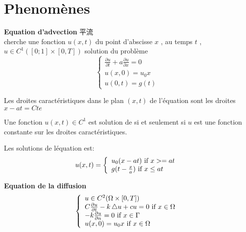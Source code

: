 \section{Phenom\`enes}
\textbf{Equation d'advection}
平流\\
cherche une fonction $u(x,t)$ du point d'abscisse $ x$ , au temps $ t$ , $ u \in C^1([0;1] \times [0,T])$ solution du probl\`eme
\begin{equation}
\left\{
  \begin{array}{ll}
		  \frac{\partial  u}{\partial t} + a \frac{\partial u}{\partial x } = 0 \\
		  u(x,0) = u_0{x} \\
		  u(0,t) = g(t)
  \end{array}
\right.
\end{equation}
\begin{definition}
		Les droites caract\'eristiques dans le plan $(x,t)$ de l'\'equation \lasteq  sont les droites$
x - at = Cte$
\end{definition}

\begin{proposition}
		Une fonction $ u(x,t) \in C^1$  est solution de \lasteq  si et seulement si $ u$  est une
fonction constante sur les droites caract\'eristiques.
\end{proposition}

Les solutions de l\'equation \lasteq est:
\begin{equation}
u(x,t)=
\left\{
  \begin{array}{ll}
		  u_0(x-at) \textrm{\ if } x >= at \\
		  g(t-\frac{x}{a}) \textrm{\ if } x \leq at
  \end{array}
\right.
\end{equation}
\bigskip

\textbf{Equation de la diffusion}
\begin{equation}
\left\{
  \begin{array}{ll}
		  u \in C^2(\Omega \times [0,T]) \\
		  C \frac{\partial  u}{\partial t} - k \mathop{}\!\mathbin\bigtriangleup u + cu =0 \textrm{\ if } x \in \Omega \\
		  -k \frac{\partial u}{\partial n} = 0 \textrm{\ if } x \in \Gamma \\
		  u(x,0) = u_0{x} \textrm{\ if } x \in \Omega\\
  \end{array}
\right.
\end{equation}
\bigskip

